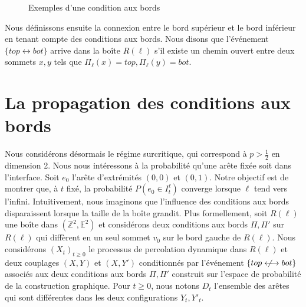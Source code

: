 \documentclass[titlepage,a4paper,12pt]{article}
\newcounter{prop}
\newcounter{cor}
\newcommand{\nlongleftrightarrow}{\longleftrightarrow \kern-15pt\not \kern15pt}
\begin{document}
\begin{figure}[h]
\center
{}
\caption{Exemples d'une condition aux bords}
\end{figure}

Nous définissons ensuite la connexion entre le bord supérieur et le bord inférieur en tenant compte des conditions aux bords. Nous disons que l'événement $\{top\longleftrightarrow bot\}$ arrive dans la boîte $R(\ell)$ s'il existe un chemin ouvert entre deux sommets $x,y$ tels que $\Pi_{\ell}(x) = top, \Pi_{\ell}(y) = bot$.
\section{La propagation des conditions aux bords}
Nous considérons désormais le régime surcritique, qui correspond à $p>\frac{1}{2}$ en dimension 2. Nous nous intéressons à la probabilité qu'une arête fixée soit dans l'interface. Soit $e_0$ l'arête d'extrémités $(0,0)$ et $(0,1)$. Notre objectif est de montrer que, à $t$ fixé, la probabilité $P(e_0 \in I^\ell_t)$ converge lorsque $\ell$ tend vers l'infini. Intuitivement, nous imaginons que l'influence des conditions aux bords disparaissent lorsque la taille de la boîte grandit. %
Plus formellement, soit $R(\ell)$ une boîte dans $(\mathbb{Z}^2,\mathbb{E}^2)$ et considérons deux conditions aux bords $\Pi, \Pi'$ sur $R(\ell)$ qui diffèrent en un seul sommet $v_0$ sur le bord gauche de $R(\ell)$. Nous considérons $(X_t)_{t\geqslant 0}$ le processus de percolation dynamique dans $R(\ell)$ et deux couplages $(X,Y)$ et $(X,Y')$ conditionnés par l'événement $\{top\nlongleftrightarrow bot\}$ associés aux deux conditions aux bords $\Pi, \Pi'$ construit sur l'espace de probabilité de la construction graphique. Pour $t\geqslant 0$, nous notons $D_t$ l'ensemble des arêtes qui sont différentes dans les deux configurations $Y_t,Y'_t$.
\end{document}
